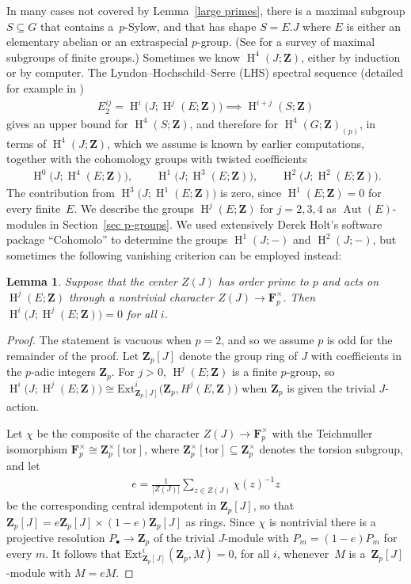 \documentclass[pdftex]{sigma}
\numberwithin{equation}{section}
\newtheorem{Lemma}[Theorem]{Lemma}
\newcommand\bF{\mathbf F}
\newcommand\bZ{\mathbf Z}
\DeclareMathOperator\homology{H}
\renewcommand\H{\homology}
\newcommand\<\langle
\renewcommand\>\rangle
\DeclareMathOperator\Aut{Aut}
\newcommand{\Ext}{\mathrm{Ext}}
\begin{document}
In many cases not covered by Lemma~\ref{large primes}, there is a maximal subgroup $S \subseteq G$ that contains a~$p$-Sylow, and that has shape $S = E.J$ where $E$ is either an elementary abelian or an extraspecial $p$-group. (See \cite{MR3682590} for a survey of maximal subgroups of finite groups.)
Sometimes we know $\H^4(J;\bZ)$, either by induction or by computer. The Lyndon--Hochschild--Serre (LHS) spectral sequence {(detailed for example in \cite[Section~6.8]{MR1269324})}
\begin{gather*}
E_2^{ij} = \H^i\big(J;\H^j(E;\bZ)\big) \implies \H^{i+j}(S;\bZ)
\end{gather*}
gives an upper bound for $\H^4(S;\bZ)$, and therefore for $\H^4(G;\bZ)_{(p)}$, in terms of $\H^4(J;\bZ)$, which we assume is known by earlier computations, together with the cohomology groups with twisted coefficients
\begin{gather*}
\H^0\big(J;\H^4(E;\bZ)\big), \qquad \H^1\big(J;\H^3(E;\bZ)\big), \qquad \H^2\big(J;\H^2(E;\bZ)\big).
\end{gather*}
The contribution from $\H^3\big(J;\H^1(E;\bZ)\big)$ is zero, since $\H^1(E;\bZ)= 0$ for every finite~$E$.
We describe the groups $\H^j(E;\bZ)$ for $j = {2,3,4}$ as $\Aut(E)$-modules in Section~\ref{sec p-groups}. We used extensively Derek Holt's software package ``Cohomolo'' to determine the groups $\H^1(J;-)$ and $\H^2(J;-)$, but sometimes the following vanishing criterion can be employed instead:

\begin{Lemma}\label{lemma:central character} Suppose that the center $Z(J)$ has order prime to $p$ and acts on $\H^j(E;\bZ)$ through a nontrivial character $Z(J) \to \bF_p^\times$. Then $\H^i\big(J; \H^j(E;\bZ)\big) = 0$ for all $i$.
\end{Lemma}
\begin{proof}The statement is vacuous when $p=2$, and so we assume $p$ is odd for the remainder of the proof.
Let $\bZ_p[J]$ denote the group ring of $J$ with coefficients in the $p$-adic integers $\bZ_p$.
For $j > 0$, $\H^j(E;\bZ)$ is a finite $p$-group, so $\H^i\big(J;\H^j(E;\bZ)\big) \cong \Ext^i_{\bZ_p[J]}\big(\bZ_p,H^j(E,\bZ)\big)$ when $\bZ_p$ is given the trivial $J$-action.

Let $\chi$ be the composite of the character $Z(J) \to \bF_p^{\times}$ with the Teichmuller isomorphism
{$\bF_p^\times \cong \bZ_p^\times[\mathrm{tor}]$, where $\bZ_p^\times[\mathrm{tor}] \subseteq \bZ_p^\times$ denotes the torsion subgroup,}
and let
\begin{gather*}
e = \frac1{|Z(J)|}\sum_{z \in Z(J)} \chi(z)^{-1} z
\end{gather*}
be the corresponding central idempotent in $\bZ_p[J]$, so that $\bZ_p[J] = e\bZ_p[J] \times (1-e)\bZ_p[J]$ as rings. Since $\chi$ is nontrivial there is a projective resolution $P_{\bullet} \to \bZ_p$ of the trivial $J$-module with $P_m = (1-e)P_m$ for every $m$. It follows that $\Ext^i_{\bZ_p[J]}(\bZ_p,M) = 0$, for all $i$, whenever~$M$ is a~$\bZ_p[J]$-module with $M = eM$.
\end{proof}
\end{document}
